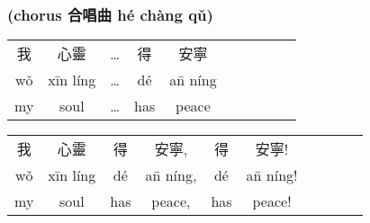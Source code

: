 \begin{center}
\subsubsection*{(chorus \hspace{3ex} 合唱曲 \hspace{3ex} h\'{e} ch\`{a}ng q\v{u}) } 
\end{center}

\begin{tabular}{*{10}{c}}
   我     & 心靈             & \ldots & 得     & 安寧             \\
   w\v{o} & x\={i}n l\'{i}ng & \ldots & d\'{e} & a\={n} n\'{i}ng  \\
   my     & soul             & \ldots & has    & peace           
\end{tabular}

\begin{tabular}{*{10}{c}}
   我     & 心靈             & 得     & 安寧,            & 得     & 安寧!            \\
   w\v{o} & x\={i}n l\'{i}ng & d\'{e} & a\={n} n\'{i}ng, & d\'{e} & a\={n} n\'{i}ng! \\
   my     & soul             & has    & peace,           & has    & peace!
\end{tabular}





